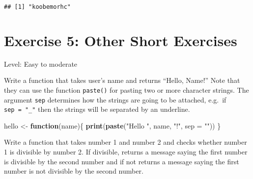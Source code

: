 \documentclass[]{book}
\newenvironment{Shaded}{\begin{snugshade}}{\end{snugshade}}
\newcommand{\ControlFlowTok}[1]{\textcolor[rgb]{0.13,0.29,0.53}{\textbf{#1}}}
\newcommand{\DataTypeTok}[1]{\textcolor[rgb]{0.13,0.29,0.53}{#1}}
\newcommand{\DecValTok}[1]{\textcolor[rgb]{0.00,0.00,0.81}{#1}}
\newcommand{\KeywordTok}[1]{\textcolor[rgb]{0.13,0.29,0.53}{\textbf{#1}}}
\newcommand{\NormalTok}[1]{#1}
\newcommand{\OperatorTok}[1]{\textcolor[rgb]{0.81,0.36,0.00}{\textbf{#1}}}
\newcommand{\StringTok}[1]{\textcolor[rgb]{0.31,0.60,0.02}{#1}}
\begin{document}
\begin{verbatim}
## [1] "koobemorhc"
\end{verbatim}

\hypertarget{exercise-5-other-short-exercises}{%
\section*{Exercise 5: Other Short Exercises}\label{exercise-5-other-short-exercises}}

Level: Easy to moderate

Write a function that takes user's name and returns ``Hello, Name!'' Note that they can use the function \texttt{paste()} for pasting two or more character strings. The argument \texttt{sep} determines how the strings are going to be attached, e.g.~if \texttt{sep\ =\ "\_"} then the strings will be separated by an underline.

\begin{Shaded}
\begin{Highlighting}[]
\NormalTok{hello <-}\StringTok{ }\ControlFlowTok{function}\NormalTok{(name)\{}
    \KeywordTok{print}\NormalTok{(}\KeywordTok{paste}\NormalTok{(}\StringTok{"Hello "}\NormalTok{, name, }\StringTok{"!"}\NormalTok{, }\DataTypeTok{sep =} \StringTok{""}\NormalTok{))}
\NormalTok{\}}
\end{Highlighting}
\end{Shaded}

Write a function that takes number 1 and number 2 and checks whether number 1 is divisible by number 2. If divisible, returns a message saying the first number is divisible by the second number and if not returns a message saying the first number is not divisible by the second number.

\begin{Shaded}
\end{Shaded}
\end{document}
